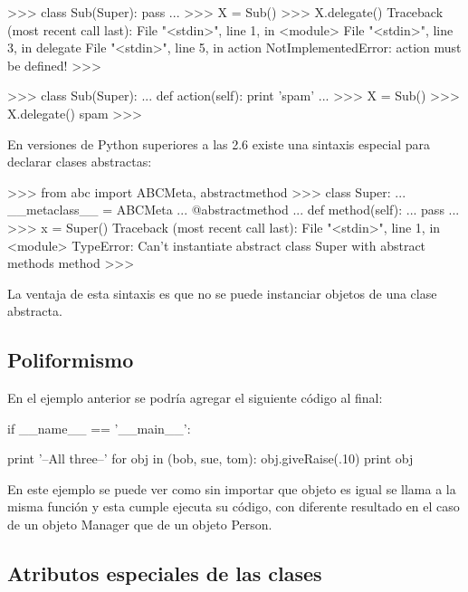 \begin{pyglist} [language=python]
>>> class Sub(Super): pass
... 
>>> X = Sub()
>>> X.delegate()
Traceback (most recent call last):
  File "<stdin>", line 1, in <module>
  File "<stdin>", line 3, in delegate
  File "<stdin>", line 5, in action
NotImplementedError: action must be defined!
>>> 

>>> class Sub(Super):
...     def action(self): print 'spam'
... 
>>> X = Sub()
>>> X.delegate()
spam
>>> 
\end{pyglist}

En versiones de Python superiores a las 2.6 existe una sintaxis especial para declarar clases abstractas:\\

\begin{pyglist} [language=python]
>>> from abc import ABCMeta, abstractmethod
>>> class Super:
...     __metaclass__ = ABCMeta
...     @abstractmethod
...     def method(self):
...         pass
... 
>>> x = Super()
Traceback (most recent call last):
  File "<stdin>", line 1, in <module>
TypeError: Can't instantiate abstract class Super with abstract methods method
>>> 
\end{pyglist}

La ventaja de esta sintaxis es que no se puede instanciar objetos de una clase abstracta.


\subsection{Poliformismo}

En el ejemplo anterior se podría agregar el siguiente código al final:\\

\begin{pyglist} [language=python]
if __name__ == '__main__':
       
    print '--All three--'
    for obj in (bob, sue, tom):
        obj.giveRaise(.10)
        print obj
\end{pyglist}

En este ejemplo se puede ver como sin importar que objeto es igual se llama a la misma función y esta cumple ejecuta su código, con diferente resultado en el caso de un objeto Manager que de un objeto Person.\\

\subsection{Atributos especiales de las clases}

